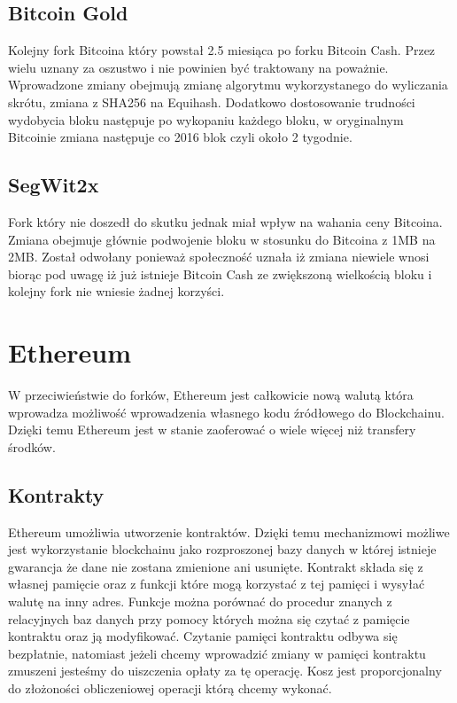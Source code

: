 \documentclass[journal,12pt,onecolumn,draftclsnofoot,]{IEEEtran}
\begin{document}
\subsection{Bitcoin Gold}

Kolejny fork Bitcoina który powstał 2.5 miesiąca po forku Bitcoin Cash. Przez wielu uznany za oszustwo i nie powinien
być traktowany na poważnie. Wprowadzone zmiany obejmują zmianę algorytmu wykorzystanego do wyliczania skrótu, zmiana z
SHA256 na Equihash. Dodatkowo dostosowanie trudności wydobycia bloku następuje po wykopaniu każdego bloku, w oryginalnym
Bitcoinie zmiana następuje co 2016 blok czyli około 2 tygodnie.

\subsection{SegWit2x}

Fork który nie doszedł do skutku jednak miał wpływ na wahania ceny Bitcoina. Zmiana obejmuje głównie podwojenie bloku w
stosunku do Bitcoina z 1MB na 2MB. Został odwołany ponieważ społeczność uznała iż zmiana niewiele wnosi biorąc pod uwagę
iż już istnieje Bitcoin Cash ze zwiększoną wielkością bloku i kolejny fork nie wniesie żadnej korzyści.

\section{Ethereum}

W przeciwieństwie do forków, Ethereum jest całkowicie nową walutą która wprowadza możliwość wprowadzenia własnego kodu
źródłowego do Blockchainu. Dzięki temu Ethereum jest w stanie zaoferować o wiele więcej niż transfery środków.

\subsection{Kontrakty}

Ethereum umożliwia utworzenie kontraktów. Dzięki temu mechanizmowi możliwe jest wykorzystanie blockchainu jako
rozproszonej bazy danych w której istnieje gwarancja że dane nie zostana zmienione ani usunięte. Kontrakt składa się z
własnej pamięcie oraz z funkcji które mogą korzystać z tej pamięci i wysyłać walutę na inny adres. Funkcje można
porównać do procedur znanych z relacyjnych baz danych przy pomocy których można się czytać z pamięcie kontraktu oraz ją
modyfikować. Czytanie pamięci kontraktu odbywa się bezpłatnie, natomiast jeżeli chcemy wprowadzić zmiany w pamięci
kontraktu zmuszeni jesteśmy do uiszczenia opłaty za tę operację. Kosz jest proporcjonalny do złożoności obliczeniowej
operacji którą chcemy wykonać.
\end{document}
